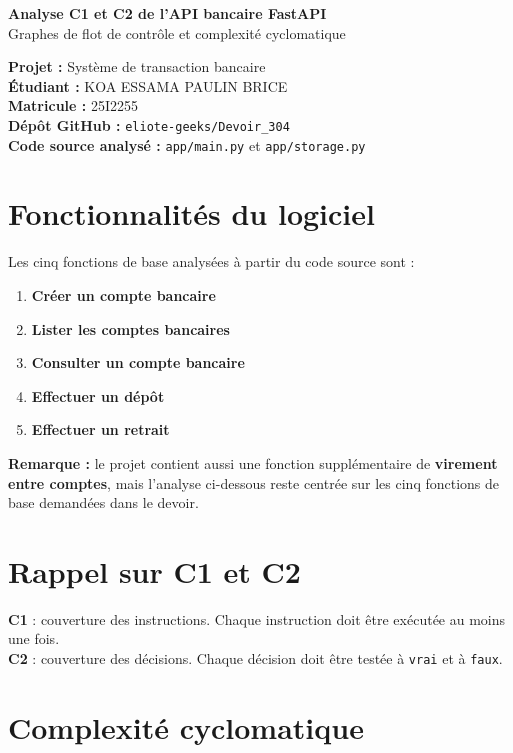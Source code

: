 \documentclass[11pt,a4paper]{article}
\begin{document}
\begin{center}
    {\LARGE\bfseries Analyse C1 et C2 de l'API bancaire FastAPI}\\[0.25cm]
    {\large Graphes de flot de contrôle et complexité cyclomatique}\\[0.5cm]
\end{center}

\textbf{Projet :} Système de transaction bancaire\\
\textbf{Étudiant :} KOA ESSAMA PAULIN BRICE\\
\textbf{Matricule :} 25I2255\\
\textbf{Dépôt GitHub :} \texttt{eliote-geeks/Devoir\_304}\\
\textbf{Code source analysé :} \texttt{app/main.py} et \texttt{app/storage.py}

\section{Fonctionnalités du logiciel}

Les cinq fonctions de base analysées à partir du code source sont :

\begin{enumerate}[leftmargin=1.2cm]
    \item \textbf{Créer un compte bancaire}
    \item \textbf{Lister les comptes bancaires}
    \item \textbf{Consulter un compte bancaire}
    \item \textbf{Effectuer un dépôt}
    \item \textbf{Effectuer un retrait}
\end{enumerate}

\textbf{Remarque :} le projet contient aussi une fonction supplémentaire de \textbf{virement entre comptes}, mais l'analyse ci-dessous reste centrée sur les cinq fonctions de base demandées dans le devoir.

\section{Rappel sur C1 et C2}

\textbf{C1} : couverture des instructions. Chaque instruction doit être exécutée au moins une fois.\\
\textbf{C2} : couverture des décisions. Chaque décision doit être testée à \texttt{vrai} et à \texttt{faux}.

\section{Complexité cyclomatique}
\end{document}
